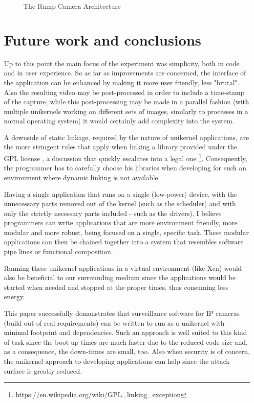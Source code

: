 \documentclass[10pt,a4paper,twoside]{article}
\begin{document}
\begin{figure}[H]
  \centering
  \caption{The Rump Camera Architecture}
  \label{fig:archdiagram}
\end{figure}

\section{Future work and conclusions}

Up to this point the main focus of the experiment was simplicity, both in code and in user experience.
So as far as improvements are concerned, the interface of the application can be enhanced by making
it more user friendly, less "brutal". Also the resulting video may be post-processed in order to
include a time-stamp of the capture,
while this post-processing may be made in a parallel fashion (with multiple unikernels working
on different sets of images, similarly to processes in a normal operating system) it would certainly add complexity
into the system.

A downside of static linkage, required by the nature of unikernel applications, are the more
stringent rules that apply when linking a library provided under the GPL license \cite{gpl},
a discussion that quickly escalates into a legal one
\footnote{https://en.wikipedia.org/wiki/GPL\_linking\_exception}. Consequently,
the programmer has to carefully choose his libraries when developing for such an environment where
dynamic linking is not available.

Having a single application that runs on a single (low-power) device, with the unnecessary parts removed out
of the kernel (such as the scheduler) and with only the strictly necessary parts included - such as the drivers),
I believe programmers can write applications that are more environment friendly,
more modular and more robust, being focused on a single, specific task. These modular applications can
then be chained together into a system that resembles software pipe lines or functional composition.

Running these unikernel applications in a virtual environment (like Xen) would also be
beneficial to our surrounding medium since the applications would be started when
needed and stopped at the proper times, thus consuming less energy. \cite{DataCenterEnergyForeCast} \cite{JinWenChen}

This paper successfully demonstrates that surveillance software for IP cameras
(build out of real requirements) can be written to run as a unikernel with minimal footprint and dependencies.
 Such an approach is well suited to this kind of task since the boot-up times
 are much faster due to the reduced code size and, as a consequence, the down-times are small, too.
 Also when security is of concern, the unikernel approach to developing applications can help since
 the attack surface is greatly reduced.
\end{document}
